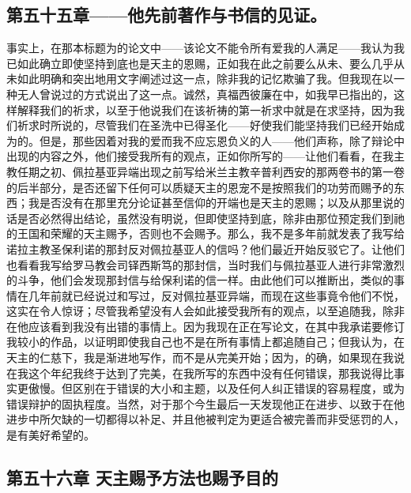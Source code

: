 
\subsection{第五十五章——他先前著作与书信的见证。}

事实上，在那本标题为的论文中——该论文不能令所有爱我的人满足——我认为我已如此确立即使坚持到底也是天主的恩赐，正如我在此之前要么从未、要么几乎从未如此明确和突出地用文字阐述过这一点，除非我的记忆欺骗了我。但我现在以一种无人曾说过的方式说出了这一点。诚然，真福西彼廉在中，如我早已指出的，这样解释我们的祈求，以至于他说我们在该祈祷的第一祈求中就是在求坚持，因为我们祈求时所说的，尽管我们在圣洗中已得圣化——好使我们能坚持我们已经开始成为的。但是，那些因着对我的爱而我不应忘恩负义的人——他们声称，除了辩论中出现的内容之外，他们接受我所有的观点，正如你所写的——让他们看看，在我主教任期之初、佩拉基亚异端出现之前写给米兰主教辛普利西安的那两卷书的第一卷的后半部分，是否还留下任何可以质疑天主的恩宠不是按照我们的功劳而赐予的东西；我是否没有在那里充分论证甚至信仰的开端也是天主的恩赐；以及从那里说的话是否必然得出结论，虽然没有明说，但即使坚持到底，除非由那位预定我们到祂的王国和荣耀的天主赐予，否则也不会赐予。那么，我不是多年前就发表了我写给诺拉主教圣保利诺的那封反对佩拉基亚人的信吗？他们最近开始反驳它了。让他们也看看我写给罗马教会司铎西斯笃的那封信，当时我们与佩拉基亚人进行非常激烈的斗争，他们会发现那封信与给保利诺的信一样。由此他们可以推断出，类似的事情在几年前就已经说过和写过，反对佩拉基亚异端，而现在这些事竟令他们不悦，这实在令人惊讶；尽管我希望没有人会如此接受我所有的观点，以至追随我，除非在他应该看到我没有出错的事情上。因为我现在正在写论文，在其中我承诺要修订我较小的作品，以证明即使我自己也不是在所有事情上都追随自己；但我认为，在天主的仁慈下，我是渐进地写作，而不是从完美开始；因为，的确，如果现在我说在我这个年纪我终于达到了完美，在我所写的东西中没有任何错误，那我说得比事实更傲慢。但区别在于错误的大小和主题，以及任何人纠正错误的容易程度，或为错误辩护的固执程度。当然，对于那个今生最后一天发现他正在进步、以致于在他进步中所欠缺的一切都得以补足、并且他被判定为更适合被完善而非受惩罚的人，是有美好希望的。\par


\subsection{第五十六章  天主赐予方法也赐予目的}

